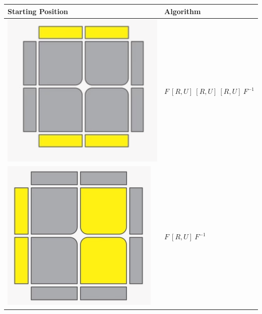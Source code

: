 \documentclass[12pt,a4paper]{article}
\theoremstyle{custom}
\begin{document}
\begin{center}
\begin{tabular}{m{4cm} m{6cm}}
\toprule
Starting Position & Algorithm  \\
\midrule
\includegraphics[scale=0.2]{images/Upside-1.png} & $F \ [ R,U ] \  [ R,U ] \  [ R,U ] \ F^{-1}$ \\
\includegraphics[scale=0.4]{images/Upside-2.png} & $F \ [ R,U ] \ F^{-1}$ \\

\end{tabular}
\end{center}
\end{document}
